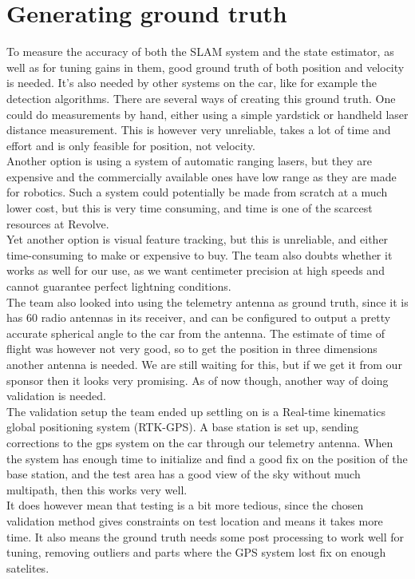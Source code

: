 \section{Generating ground truth}

To measure the accuracy of both the SLAM system and the state estimator, as well as for tuning gains in them, good ground truth of both position and velocity is needed. It's also needed by other systems on the car, like for example the detection algorithms. There are several ways of creating this ground truth. One could do measurements by hand, either using a simple yardstick or handheld laser distance measurement. This is however very unreliable, takes a lot of time and effort and is only feasible for position, not velocity. \\ 

Another option is using a system of automatic ranging lasers, but they are expensive and the commercially available ones have low range as they are made for robotics. Such a system could potentially be made from scratch at a much lower cost, but this is very time consuming, and time is one of the scarcest resources at Revolve. \\

Yet another option is visual feature tracking, but this is unreliable, and either time-consuming to make or expensive to buy. The team also doubts whether it works as well for our use, as we want centimeter precision at high speeds and cannot guarantee perfect lightning conditions. \\ 

The team also looked into using the telemetry antenna as ground truth, since it is has $60$ radio antennas in its receiver, and can be configured to output a pretty accurate spherical angle to the car from the antenna. The estimate of time of flight was however not very good, so to get the position in three dimensions another antenna is needed. We are still waiting for this, but if we get it from our sponsor then it looks very promising. As of now though, another way of doing validation is needed. \\

The validation setup the team ended up settling on is a Real-time kinematics global positioning system (RTK-GPS). A base station is set up, sending corrections to the gps system on the car through our telemetry antenna. When the system has enough time to initialize and find a good fix on the position of the base station, and the test area has a good view of the sky without much multipath, then this works very well. \\

It does however mean that testing is a bit more tedious, since the chosen validation method gives constraints on test location and means it takes more time. It also means the ground truth needs some post processing to work well for tuning, removing outliers and parts where the GPS system lost fix on enough satelites.
